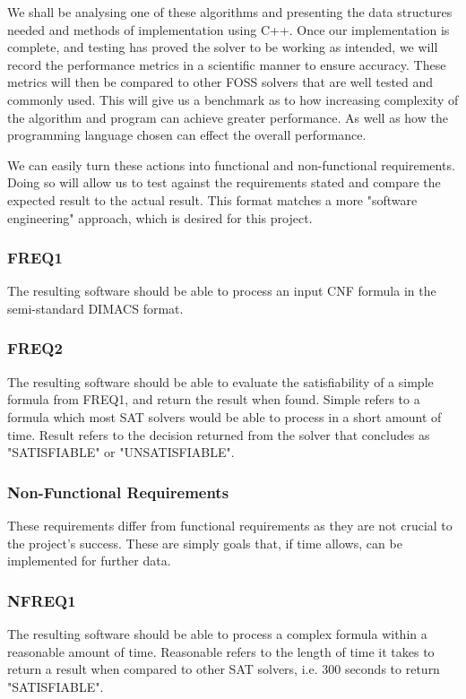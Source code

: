 \documentclass{article}
\begin{document}
We shall be analysing one of these algorithms and presenting the data structures needed and methods of implementation using C++. Once our implementation is complete, and testing has proved the solver to be working as intended, we will record the performance metrics in a scientific manner to ensure accuracy. These metrics will then be compared to other FOSS solvers that are well tested and commonly used. This will give us a benchmark as to how increasing complexity of the algorithm and program can achieve greater performance. As well as how the programming language chosen can effect the overall performance.

We can easily turn these actions into functional and non-functional requirements. Doing so will allow us to test against the requirements stated and compare the expected result to the actual result. This format matches a more "software engineering" approach, which is desired for this project.

\subsubsection{FREQ1}
The resulting software should be able to process an input CNF formula in the semi-standard DIMACS format.

\subsubsection{FREQ2}
The resulting software should be able to evaluate the satisfiability of a simple formula from FREQ1, and return the result when found. Simple refers to a formula which most SAT solvers would be able to process in a short amount of time. Result refers to the decision returned from the solver that concludes as "SATISFIABLE" or "UNSATISFIABLE".

\subsubsection{Non-Functional Requirements}
These requirements differ from functional requirements as they are not crucial to the project's success. These are simply goals that, if time allows, can be implemented for further data.

\subsubsection{NFREQ1}
The resulting software should be able to process a complex formula within a reasonable amount of time. Reasonable refers to the length of time it takes to return a result when compared to other SAT solvers, i.e. 300 seconds to return "SATISFIABLE".
\end{document}
